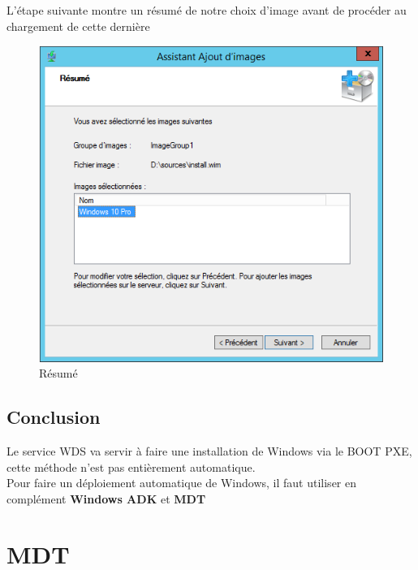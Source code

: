 \documentclass[11pt,a4paper,oneside]{article}
\begin{document}
L'étape suivante montre un résumé de notre choix d'image avant de procéder au chargement de cette dernière
\begin{figure}[hbtp]
\centering
\includegraphics[scale=0.7]{Pictures/Configuration/Conf16.png}
\caption{\label{etiquette} Résumé}
\end{figure}

\subsection{Conclusion}

Le service WDS va servir à faire une installation de Windows via le BOOT PXE, cette méthode n'est pas entièrement automatique.\\

Pour faire un déploiement automatique de Windows, il faut utiliser en complément \textbf{Windows ADK} et \textbf{MDT}


\newpage
\section{MDT}
\end{document}
